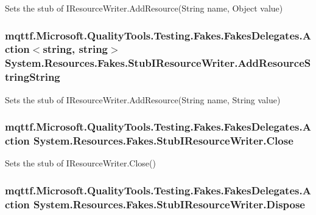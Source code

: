 Sets the stub of I\-Resource\-Writer.\-Add\-Resource(\-String name, Object value)

\hypertarget{class_system_1_1_resources_1_1_fakes_1_1_stub_i_resource_writer_a169fc515ecc0e9fbdc9c690b604bdafc}{
\subsubsection[{Add\-Resource\-String\-String}]{\setlength{\rightskip}{0pt plus 5cm}mqttf.\-Microsoft.\-Quality\-Tools.\-Testing.\-Fakes.\-Fakes\-Delegates.\-Action$<$string, string$>$ System.\-Resources.\-Fakes.\-Stub\-I\-Resource\-Writer.\-Add\-Resource\-String\-String}}\label{class_system_1_1_resources_1_1_fakes_1_1_stub_i_resource_writer_a169fc515ecc0e9fbdc9c690b604bdafc}


Sets the stub of I\-Resource\-Writer.\-Add\-Resource(\-String name, String value)

\hypertarget{class_system_1_1_resources_1_1_fakes_1_1_stub_i_resource_writer_a67bd6e57d9d573626a9c752bff9127ab}{
\subsubsection[{Close}]{\setlength{\rightskip}{0pt plus 5cm}mqttf.\-Microsoft.\-Quality\-Tools.\-Testing.\-Fakes.\-Fakes\-Delegates.\-Action System.\-Resources.\-Fakes.\-Stub\-I\-Resource\-Writer.\-Close}}\label{class_system_1_1_resources_1_1_fakes_1_1_stub_i_resource_writer_a67bd6e57d9d573626a9c752bff9127ab}


Sets the stub of I\-Resource\-Writer.\-Close()

\hypertarget{class_system_1_1_resources_1_1_fakes_1_1_stub_i_resource_writer_a99d3e352adb27cad82d1164f9a3f1702}{
\subsubsection[{Dispose}]{\setlength{\rightskip}{0pt plus 5cm}mqttf.\-Microsoft.\-Quality\-Tools.\-Testing.\-Fakes.\-Fakes\-Delegates.\-Action System.\-Resources.\-Fakes.\-Stub\-I\-Resource\-Writer.\-Dispose}}\label{class_system_1_1_resources_1_1_fakes_1_1_stub_i_resource_writer_a99d3e352adb27cad82d1164f9a3f1702}


